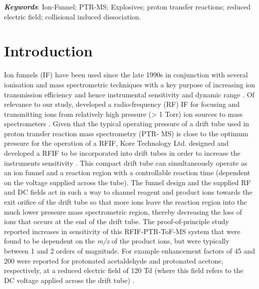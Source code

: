 \textbf{\textit{Keywords}}: Ion-Funnel; PTR-MS; Explosives; proton transfer reactions; reduced electric field; collisional induced dissociation.





\section{Introduction}

Ion funnels (IF) have been used since the late 1990s in conjunction with several ionisation and mass spectrometric techniques with a key purpose of increasing ion transmission efficiency and hence instrumental sensitivity and dynamic range \cite{shaffer1997novel,kelly2010ion}. Of relevance to our study, \citeauthor{shaffer1997novel} developed a radio-frequency (RF) IF for focusing and transmitting ions from relatively high pressure (> 1 Torr) ion sources to mass spectrometers \cite{shaffer1997novel}. Given that the typical operating pressure of a drift tube used in proton transfer reaction mass spectrometry (PTR- MS) is close to the optimum pressure for the operation of a RFIF, Kore Technology Ltd. designed and developed a RFIF to be incorporated into drift tubes in order to increase the instruments sensitivity \cite{barber2012increased}. This compact drift tube can simultaneously operate as an ion funnel and a reaction region with a controllable reaction time (dependent on the voltage supplied across the tube). The funnel design and the supplied RF and DC fields act in such a way to channel reagent and product ions towards the exit orifice of the drift tube so that more ions leave the reaction region into the much lower pressure mass spectrometric region, thereby decreasing the loss of ions that occurs at the end of the drift tube. The proof-of-principle study reported increases in sensitivity of this RFIF-PTR-ToF-MS system that were found to be dependent on the \textit{m/z} of the product ions, but were typically between 1 and 2 orders of magnitude. For example enhancement factors of 45 and 200 were reported for protonated acetaldehyde and protonated acetone, respectively, at a reduced electric field of 120 Td (where this field refers to the DC voltage applied across the drift tube) \cite{barber2012increased}. 

